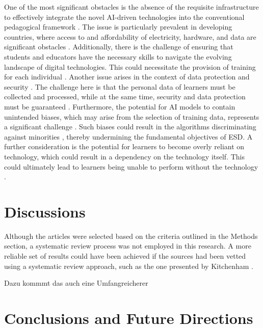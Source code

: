 \documentclass[]{lni}
\begin{document}
One of the most significant obstacles is the absence of the requisite infrastructure to effectively integrate the novel AI-driven technologies 
into the conventional pedagogical framework 
\cite{Lin2023}. 
%
The issue is particularly prevalent in developing countries, where access to and affordability of electricity, hardware, and data are significant obstacles
\cite{Tanveer2020}. 
%
Additionally, there is the challenge of ensuring that students and educators have the necessary skills to navigate the evolving landscape of digital technologies.
This could necessitate the provision of training for each individual 
\cite{Tanveer2020} \cite{10409934}.
%
Another issue arises in the context of data protection and security \cite{Lin2023}. The challenge here is that the personal data of learners must be collected and processed, 
while at the same time, security and data protection must be guaranteed \cite{Tanveer2020}.   
%
Furthermore, the potential for AI models to contain unintended biases, which may arise from the selection of training data, represents a significant challenge \cite{Lin2023}. 
Such biases could result in the algorithms discriminating against minorities \cite{angwin2022machine}, thereby undermining the fundamental objectives of ESD.
%
A further consideration is the potential for learners to become overly reliant on technology, which could result in a dependency on the technology itself. This could ultimately 
lead to learners being unable to perform without the technology \cite{Chin2010}.



%
\section{Discussions}
Although the articles were selected based on the criteria outlined in the Methods section, a systematic review process was not employed in this research. A more 
reliable set of results could have been achieved if the sources had been vetted using a systematic review approach, such as the one presented by Kitchenham 
\cite{kitchenham2007guidelines}.

Dazu kommmt das auch eine Umfangreicherer 



%
%
\section{Conclusions and Future Directions}


\newpage 

\printbibliography %
\end{document}
